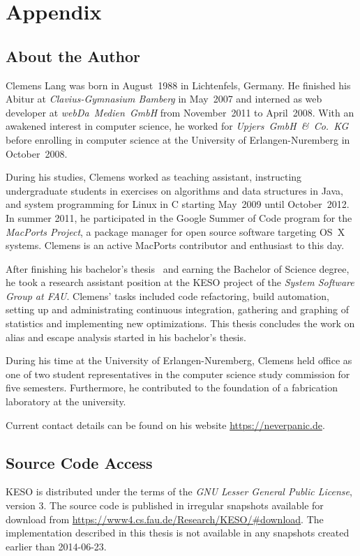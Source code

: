 
\chapter{Appendix}
	\label{chapter:appendix}

	\section{About the Author}
		\label{sec:appendix:author}
		Clemens Lang was born in August~1988 in Lichtenfels, Germany. He finished his Abitur at \emph{Clavius-Gymnasium
		Bamberg} in May~2007 and interned as web developer at \emph{webDa~Medien~GmbH} from November~2011 to April~2008.
		With an awakened interest in computer science, he worked for \emph{Upjers~GmbH~\&~Co.~KG} before enrolling in
		computer science at the University of Erlangen-Nuremberg in October~2008.

		During his studies, Clemens worked as teaching assistant, instructing undergraduate students in exercises on
		algorithms and data structures in Java, and system programming for Linux in C starting May~2009 until October~2012.
		In summer 2011, he participated in the Google Summer of Code program for the \emph{MacPorts Project}, a package
		manager for open source software targeting OS~X systems. Clemens is an active MacPorts contributor and enthusiast to
		this day.

		After finishing his bachelor's thesis~\cite{lang:12} and earning the Bachelor of Science degree, he took a research
		assistant position at the KESO project of the \emph{System Software Group at FAU}. Clemens' tasks included code
		refactoring, build automation, setting up and administrating continuous integration, gathering and graphing of
		statistics and implementing new optimizations. This thesis concludes the work on alias and escape analysis started
		in his bachelor's thesis.

		During his time at the University of Erlangen-Nuremberg, Clemens held office as one of two student representatives
		in the computer science study commission for five semesters. Furthermore, he contributed to the foundation of
		a fabrication laboratory at the university.

		Current contact details can be found on his website \url{https://neverpanic.de}.

	\clearpage
	\section{Source Code Access}
		\label{sec:appendix:source}
		KESO is distributed under the terms of the \emph{GNU Lesser General Public License}, version 3. The source code is
		published in irregular snapshots available for download from \url{https://www4.cs.fau.de/Research/KESO/#download}.
		The implementation described in this thesis is not available in any snapshots created earlier than 2014-06-23.


